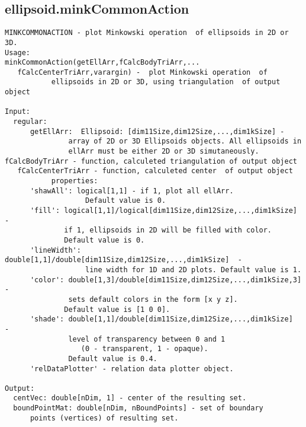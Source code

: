 \subsection{\texorpdfstring{ellipsoid.minkCommonAction}{minkCommonAction}}\label{method:ellipsoid.minkCommonAction}
\begin{verbatim}
MINKCOMMONACTION - plot Minkowski operation  of ellipsoids in 2D or 3D.
Usage:
minkCommonAction(getEllArr,fCalcBodyTriArr,...
   fCalcCenterTriArr,varargin) -  plot Minkowski operation  of
           ellipsoids in 2D or 3D, using triangulation  of output object

Input:
  regular:
      getEllArr:  Ellipsoid: [dim11Size,dim12Size,...,dim1kSize] -
               array of 2D or 3D Ellipsoids objects. All ellipsoids in
               ellArr must be either 2D or 3D simutaneously.
fCalcBodyTriArr - function, calculeted triangulation of output object
   fCalcCenterTriArr - function, calculeted center  of output object
           properties:
      'shawAll': logical[1,1] - if 1, plot all ellArr.
                   Default value is 0.
      'fill': logical[1,1]/logical[dim11Size,dim12Size,...,dim1kSize]  -
              if 1, ellipsoids in 2D will be filled with color.
              Default value is 0.
      'lineWidth': double[1,1]/double[dim11Size,dim12Size,...,dim1kSize]  -
                   line width for 1D and 2D plots. Default value is 1.
      'color': double[1,3]/double[dim11Size,dim12Size,...,dim1kSize,3] -
               sets default colors in the form [x y z].
              Default value is [1 0 0].
      'shade': double[1,1]/double[dim11Size,dim12Size,...,dim1kSize]  -
               level of transparency between 0 and 1
                  (0 - transparent, 1 - opaque).
               Default value is 0.4.
      'relDataPlotter' - relation data plotter object.

Output:
  centVec: double[nDim, 1] - center of the resulting set.
  boundPointMat: double[nDim, nBoundPoints] - set of boundary
      points (vertices) of resulting set.
\end{verbatim}
